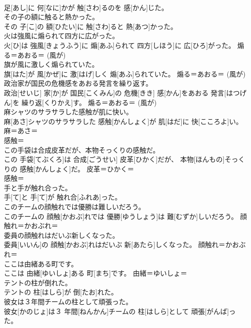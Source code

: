 \documentclass[8pt]{extreport}
\begin{document}
\begin{CJK}{UTF8}{min}
\\	足[あし]に 何[なに]かが 触[さわ]るのを 感[かん]じた。	
\\	その子の額に触ると熱かった。	
\\	その 子[こ]の 額[ひたい]に 触[さわ]ると 熱[あつ]かった。	
\\	火は強風に煽られて四方に広がった。	
\\	火[ひ]は 強風[きょうふう]に 煽[あふ]られて 四方[しほう]に 広[ひろ]がった。	煽る＝あおる＝ (風が) 
\\	旗が風に激しく煽られていた。	
\\	旗[はた]が 風[かぜ]に 激[はげ]しく 煽[あふ]られていた。	煽る＝あおる＝ (風が) 
\\	政治家が国民の危機感をあおる発言を繰り返す。	
\\	政治[せいじ] 家[か]が 国民[こくみん]の 危機[きき] 感[かん]をあおる 発言[はつげん]を 繰り返[くりかえ]す。	煽る＝あおる＝ (風が) 
\\	麻シャツのサラサラした感触が肌に快い。	
\\	麻[あさ]シャツのサラサラした 感触[かんしょく]が 肌[はだ]に 快[こころよ]い。	麻＝あさ＝ 
\\	感触＝ 
\\	この手袋は合成皮革だが、本物そっくりの感触だ。	
\\	この 手袋[てぶくろ]は 合成[ごうせい] 皮革[ひかく]だが、 本物[ほんもの]そっくりの 感触[かんしょく]だ。	皮革＝ひかく＝ 
\\	感触＝ 
\\	手と手が触れ合った。	
\\	手[て]と 手[て]が 触れ合[ふれあ]った。	
\\	このチームの顔触れでは優勝は難しいだろう。	
\\	このチームの 顔触[かおぶ]れでは 優勝[ゆうしょう]は 難[むずか]しいだろう。	顔触れ＝かおぶれ＝ 
\\	委員の顔触れはだいぶ新しくなった。	
\\	委員[いいん]の 顔触[かおぶ]れはだいぶ 新[あたら]しくなった。	顔触れ＝かおぶれ＝ 
\\	ここは由緒ある町です。	
\\	ここは 由緒[ゆいしょ]ある 町[まち]です。	由緒＝ゆいしょ＝ 
\\	テントの柱が倒れた。	
\\	テントの 柱[はしら]が 倒[たお]れた。	
\\	彼女は３年間チームの柱として頑張った。	
\\	彼女[かのじょ]は３ 年間[ねんかん]チームの 柱[はしら]として 頑張[がんば]った。	

\end{CJK}
\end{document}
